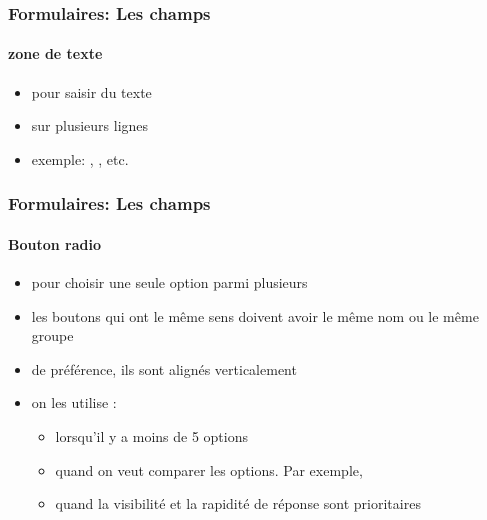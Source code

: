 \documentclass[xcolor=table]{beamer}
\begin{document}
\begin{frame}
\frametitle{Formulaires: Les champs}
\framesubtitle{zone de texte}

\begin{minipage}{0.50\textwidth}
	\begin{itemize}
		\item pour saisir du texte
		\item sur plusieurs lignes
		\item exemple: , , etc.
	\end{itemize}
\end{minipage}
\begin{minipage}{0.49\textwidth}
\end{minipage}

\end{frame}


\begin{frame}
\frametitle{Formulaires: Les champs}
\framesubtitle{Bouton radio}

\begin{minipage}{0.59\textwidth}
	\begin{itemize}
		\item pour choisir une seule option parmi plusieurs
	\end{itemize}
\end{minipage}
\begin{minipage}{0.40\textwidth}
\end{minipage}

\begin{itemize}
	\item les boutons qui ont le même sens doivent avoir le même nom ou le même groupe
	\item de préférence, ils sont alignés verticalement 
	\item on les utilise : 
	\begin{itemize}
		\item lorsqu'il y a moins de 5 options 
		\item quand on veut comparer les options. Par exemple, 
		\item quand la visibilité et la rapidité de réponse sont prioritaires
	\end{itemize}
\end{itemize}

\end{frame}
\end{document}
